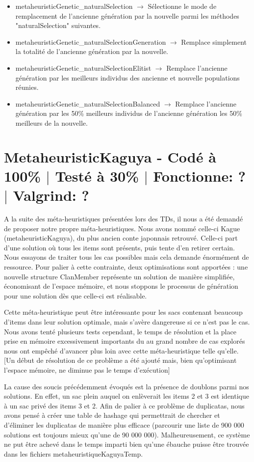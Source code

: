 \documentclass{EPUProjetPeiP}
\newcommand{\comp}[5]{
	\section[#1]{#1 {\small - Codé à #2\% $\vert$ Testé à #3\% $\vert$ Fonctionne: #4 $\vert$ Valgrind: #5}}
}
\begin{document}
\begin{itemize}
	\item metaheuristicGenetic\_naturalSelection $\longrightarrow$ Sélectionne le mode de remplacement de l'ancienne génération par la nouvelle parmi les méthodes "naturalSelection" suivantes.
	\item metaheuristicGenetic\_naturalSelectionGeneration $\longrightarrow$ Remplace simplement la totalité de l'ancienne génération par la nouvelle.
	\item metaheuristicGenetic\_naturalSelectionElitist $\longrightarrow$ Remplace l'ancienne génération par les meilleurs individus des ancienne et nouvelle populations réunies.
	\item metaheuristicGenetic\_naturalSelectionBalanced $\longrightarrow$ Remplace l'ancienne génération par les 50\% meilleurs individus de l'ancienne génération les 50\% meilleurs de la nouvelle.
\end{itemize}

\comp{MetaheuristicKaguya}{100}{30}{?}{?}
A la suite des méta-heuristiques présentées lors des TDs, il nous a été demandé de proposer notre propre méta-heuristiques. Nous avons nommé celle-ci Kague (metaheuristicKaguya), du plus ancien conte japonnais retrouvé. Celle-ci part d'une solution où tous les items sont présents, puis tente d'en retirer certain.
Nous essayons de traiter tous les cas possibles mais cela demande énormément de ressource. Pour palier à cette contrainte, deux optimisations sont apportées : une nouvelle structure ClanMember représente un solution de manière simplifiée, économisant de l'espace mémoire, et nous stoppons le processus de génération pour une solution dès que celle-ci est réalisable.

Cette méta-heuristique peut être intéressante pour les sacs contenant beaucoup d'items dans leur solution optimale, mais s'avère dangereuse si ce n'est pas le cas. Nous avons tenté plusieurs tests cependant, le temps de résolution et la place prise en mémoire excessivement importants du au grand nombre de cas explorés nous ont empêché d'avancer plus loin avec cette méta-heuristique telle qu'elle. [Un début de résolution de ce problème a été ajouté mais, bien qu'optimisant l'espace mémoire, ne diminue pas le temps d'exécution]

La cause des soucis précédemment évoqués est la présence de doublons parmi nos solutions. En effet, un sac plein auquel on enlèverait les items 2 et 3 est identique à un sac privé des items 3 et 2. Afin de palier à ce problème de duplicatas, nous avons pensé à créer une table de hashage qui permettrait de chercher et d'éliminer les duplicatas de manière plus efficace (parcourir une liste de 900 000 solutions est toujours mieux qu'une de 90 000 000). Malheureusement, ce système ne put être achevé dans le temps imparti bien qu'une ébauche puisse être trouvée dans les fichiers metaheuristiqueKaguyaTemp.
\end{document}
